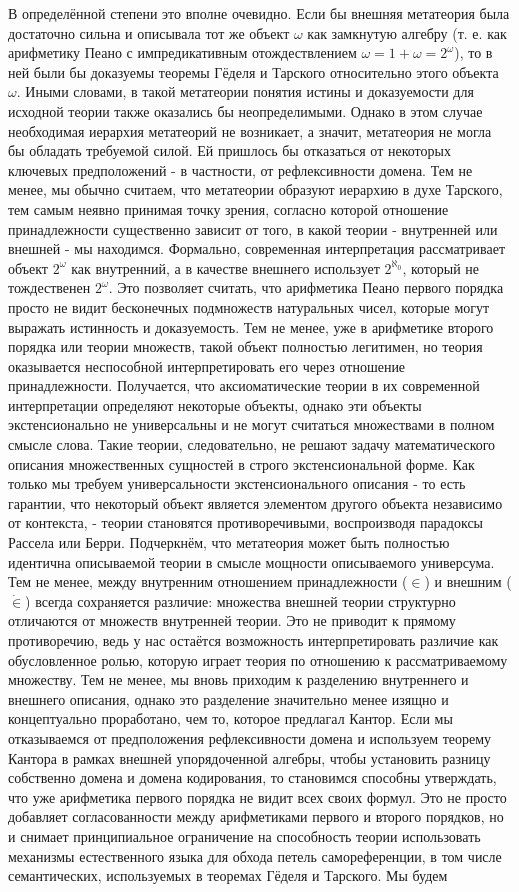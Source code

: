 \documentclass[12pt]{article}
\begin{document}
В определённой степени это вполне очевидно. Если бы внешняя метатеория была достаточно сильна и описывала тот же объект $\omega$ как замкнутую алгебру (т. е. как арифметику Пеано с импредикативным отождествлением $\omega = 1 + \omega = 2^\omega$), то в ней были бы доказуемы теоремы Гёделя и Тарского относительно этого объекта $\omega$. Иными словами, в такой метатеории понятия истины и доказуемости для исходной теории также оказались бы неопределимыми. Однако в этом случае необходимая иерархия метатеорий не возникает, а значит, метатеория не могла бы обладать требуемой силой. Ей пришлось бы отказаться от некоторых ключевых предположений - в частности, от рефлексивности домена. Тем не менее, мы обычно считаем, что метатеории образуют иерархию в духе Тарского, тем самым неявно принимая точку зрения, согласно которой отношение принадлежности существенно зависит от того, в какой теории - внутренней или внешней - мы находимся. Формально, современная интерпретация рассматривает объект  $2^\omega$ как внутренний, а в качестве внешнего использует $2^{\aleph_0}$, который не тождественен $2^{\omega}$. Это позволяет считать, что арифметика Пеано первого порядка просто не видит бесконечных подмножеств натуральных чисел, которые могут выражать истинность и доказуемость. Тем не менее, уже в арифметике второго порядка или теории множеств, такой объект полностью легитимен, но теория оказывается неспособной интерпретировать его через отношение принадлежности. Получается, что аксиоматические теории в их современной интерпретации определяют некоторые объекты, однако эти объекты экстенсионально не универсальны и не могут считаться множествами в полном смысле слова. Такие теории, следовательно, не решают задачу математического описания множественных сущностей в строго экстенсиональной форме. Как только мы требуем универсальности экстенсионального описания - то есть гарантии, что некоторый объект является элементом другого объекта независимо от контекста, - теории становятся противоречивыми, воспроизводя парадоксы Рассела или Берри. Подчеркнём, что метатеория может быть полностью идентична описываемой теории в смысле мощности описываемого универсума. Тем не менее, между внутренним отношением принадлежности ($\in$) и внешним ($\dot{\in}$) всегда сохраняется различие: множества внешней теории структурно отличаются от множеств внутренней теории. Это не приводит к прямому противоречию, ведь у нас остаётся возможность интерпретировать различие как обусловленное ролью, которую играет теория по отношению к рассматриваемому множеству. Тем не менее, мы вновь приходим к разделению внутреннего и внешнего описания, однако это разделение значительно менее изящно и концептуально проработано, чем то, которое предлагал Кантор. Если мы отказываемся от предположения рефлексивности домена и используем теорему Кантора в рамках внешней упорядоченной алгебры, чтобы установить разницу собственно домена и домена кодирования, то становимся способны утверждать, что уже арифметика первого порядка не видит всех своих формул. Это не просто добавляет согласованности между арифметиками первого и второго порядков, но и снимает принципиальное ограничение на способность теории использовать механизмы естественного языка для обхода петель самореференции, в том числе семантических, используемых в теоремах Гёделя и Тарского. Мы будем 
\end{document}
